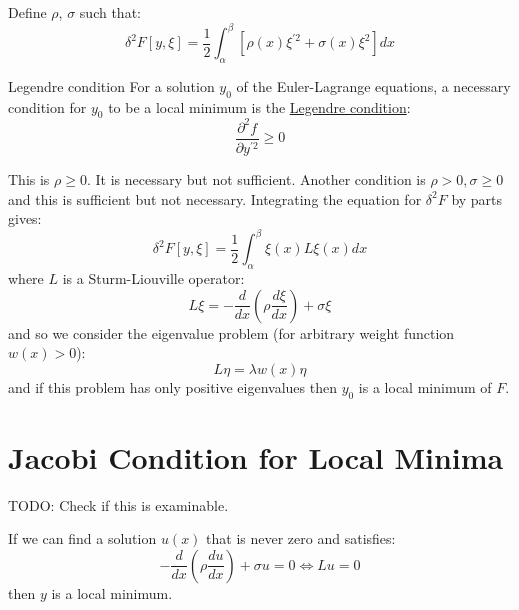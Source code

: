 \documentclass[../Main.tex]{subfiles}
\begin{document}
Define $\rho$, $\sigma$ such that:
\begin{equation*}
    \delta^2 F[y, \xi] = \frac12 \int_{\alpha}^{\beta} \left[\rho(x) \xi^{\prime 2} + \sigma(x) \xi^2\right] dx 
\end{equation*}
\begin{definition}{Legendre condition}
    For a solution $y_0$ of the Euler-Lagrange equations, a necessary condition for $y_0$ to be a local minimum is the \underline{Legendre condition}:
    \begin{equation*}
        \frac{\partial^{2}f}{\partial y^{\prime 2}} \geq 0
    \end{equation*}
\end{definition}
This is $\rho \geq 0$. It is necessary but not sufficient. Another condition is $\rho > 0, \sigma \geq 0$ and this is sufficient but not necessary. Integrating the equation for $\delta^2F$ by parts gives:
\begin{equation*}
    \delta^2 F[y, \xi] = \frac12 \int_{\alpha}^{\beta} \xi(x) L\xi(x) dx
\end{equation*}
where $L$ is a Sturm-Liouville operator:
\begin{equation*}
    L\xi = -\frac{d}{dx} \left(\rho \frac{d\xi}{dx}\right) + \sigma \xi
\end{equation*}
and so we consider the eigenvalue problem (for arbitrary weight function $w(x) > 0$):
\begin{equation*}
    L\eta = \lambda w(x) \eta
\end{equation*}
and if this problem has only positive eigenvalues then $y_0$ is a local minimum of $F$.
\section{Jacobi Condition for Local Minima}
TODO: Check if this is examinable. %

If we can find a solution $u(x)$ that is never zero and satisfies:
\begin{equation*}
    -\frac{d}{dx} \left(\rho \frac{du}{dx}\right) + \sigma u = 0 \iff Lu = 0
\end{equation*}
then $y$ is a local minimum.
\end{document}
